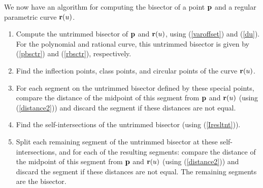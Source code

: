 We now have an algorithm for computing the bisector of a point
${\bf p}$ and a regular parametric curve ${\bf r}(u)$.

\begin{enumerate}
\item
	Compute the untrimmed bisector of ${\bf p}$ and ${\bf r}(u)$,
	using (\ref{varoffset}) and (\ref{du}).
	For the polynomial and rational curve, this untrimmed bisector
	is given by (\ref{pbsctr}) and (\ref{rbsctr}), respectively.
\item
	Find the inflection points, class points, and circular points 	
	of the curve ${\bf r}(u)$.
\item
	For each segment on the untrimmed bisector defined by these 
	special points, compare the distance of the midpoint of this
	segment from ${\bf p}$ and ${\bf r}(u)$ (using (\ref{distance2}))
	and discard the segment if these distances are not equal.
\item
	Find the self-intersections of the untrimmed bisector
	(using (\ref{Iresltnt})).
\item
	Split each remaining segment of the untrimmed bisector
	at these self-intersections, and for each of the resulting
	segments: compare the distance of the midpoint of this
	segment from ${\bf p}$ and ${\bf r}(u)$ (using (\ref{distance2}))
	and discard the segment if these distances are not equal.
	The remaining segments are the bisector.
\end{enumerate}

